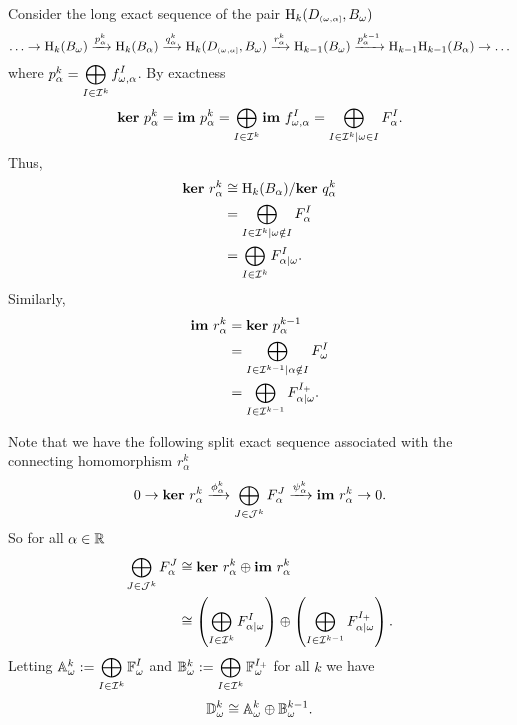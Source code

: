 Consider the long exact sequence of the pair $\mathrm{H}_k(D_{\scriptscriptstyle (\omega,\alpha]}, B_\omega)$
\[ \ldots\to \mathrm{H}_k(B_\omega)\xrightarrow{p_\alpha^k} \mathrm{H}_k(B_\alpha)\xrightarrow{q_\alpha^k}\mathrm{H}_k(D_{\scriptscriptstyle (\omega,\alpha]}, B_\omega)\xrightarrow{r_\alpha^k} \mathrm{H}_{k-1}(B_\omega)\xrightarrow{p_\alpha^{k-1}}\mathrm{H}_{k-1}\mathrm{H}_{k-1}(B_\alpha)\to\ldots\]
where $p_\alpha^k = \displaystyle\bigoplus_{I\in\mathcal{I}^k} f_{\omega,\alpha}^I$.
By exactness %
\[\mathbf{ker}~p_\alpha^k = \mathbf{im}~p_\alpha^k = \bigoplus_{I\in\mathcal{I}^k}\mathbf{im}~f_{\omega,\alpha}^I = \bigoplus_{I\in\mathcal{I}^k \mid \omega\in I} F_\alpha^I.\]
Thus,
\begin{align*}
  \mathbf{ker}~r_\alpha^k &\cong \mathrm{H}_k(B_\alpha) / \mathbf{ker}~q_\alpha^k\\
    &= \bigoplus_{I\in \mathcal{I}^k\mid \omega\notin I} F_\alpha^I\\
    &= \bigoplus_{I\in\mathcal{I}^k} F_{\alpha\mid \omega}^I.
\end{align*}
Similarly,
\begin{align*} \im~r_\alpha^k &= \ker~p_\alpha^{k-1}\\
  &= \bigoplus_{I\in\I^{k-1}\mid \alpha\notin I} F_\omega^I\\ %
  &= \bigoplus_{I\in\I^{k-1}} F_{\alpha\mid\omega}^{I_+}.
\end{align*}

Note that we have the following split exact sequence associated with the connecting homomorphism $r_\alpha^k$
\[ 0\to \mathbf{ker}~r_\alpha^k\xrightarrow{\phi_\alpha^k}\bigoplus_{J\in\mathcal{J}^k} F_\alpha^J\xrightarrow{\psi_\alpha^k}\mathbf{im}~r_\alpha^k\to 0.\]
So for all $\alpha\in\mathbb{R}$
\begin{align*}
  \bigoplus_{J\in\mathcal{J}^k} F_\alpha^J &\cong \mathbf{ker}~r_\alpha^k\oplus \mathbf{im}~r_\alpha^k\\
    &\cong\left(\bigoplus_{I\in\mathcal{I}^k} F_{\alpha\mid \omega}^I\right)\oplus\left(\bigoplus_{I\in\mathcal{I}^{k-1}} F_{\alpha\mid\omega}^{I_+}\right).
\end{align*}
Letting $\mathbb{A}_\omega^k := \displaystyle\bigoplus_{I\in\mathcal{I}^k} \mathbb{F}_\omega^I$ and $\mathbb{B}_\omega^k := \displaystyle\bigoplus_{I\in\mathcal{I}^k} \mathbb{F}_\omega^{I_+}$ for all $k$ we have
\[ \mathbb{D}_{\omega}^k \cong \mathbb{A}_\omega^k\oplus \mathbb{B}_\omega^{k-1}.\]%

